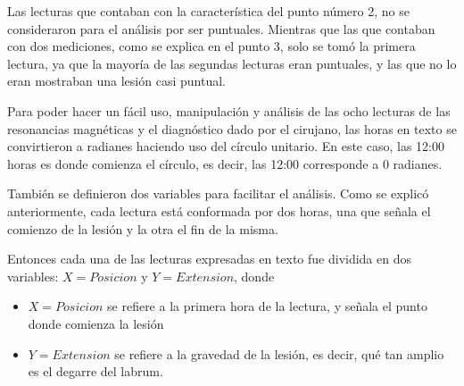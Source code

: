 \documentclass[11pt]{book}
\newcommand{\forceindent}{\leavevmode{\parindent=2em\indent}} %
\begin{document}
\begin{enumerate}
			\end{enumerate}	
			
			\forceindent Las lecturas que contaban con la característica del punto número 2, no se consideraron para el análisis por ser puntuales. Mientras que las que contaban con dos mediciones, como se explica en el punto 3, solo se tomó la primera lectura, ya que la mayoría de las segundas lecturas eran puntuales, y las que no lo eran mostraban una lesión casi puntual. 
			
			
			\forceindent Para poder hacer un fácil uso, manipulación y análisis de las ocho lecturas de las resonancias magnéticas y el diagnóstico dado por el cirujano, las horas en texto se convirtieron a radianes haciendo uso del círculo unitario. En este caso, las 12:00 horas es donde comienza el círculo, es decir, las 12:00 corresponde a 0 radianes.
			
			\forceindent También se definieron dos variables para facilitar el análisis. Como se explicó anteriormente, cada lectura está conformada por dos horas, una que señala el comienzo de la lesión y la otra el fin de la misma. 
			
			\forceindent Entonces cada una de las lecturas expresadas en texto fue dividida en dos variables: $X=Posicion$ y $Y=Extension$, donde 
			\begin{itemize}
				\item $X=Posicion$ se refiere a la primera hora de la lectura, y señala el punto donde comienza la lesión 
				\item $Y=Extension$ se refiere a la gravedad de la lesión, es decir, qué tan amplio es el degarre del labrum.
		    \end{itemize}
			
\end{document}
